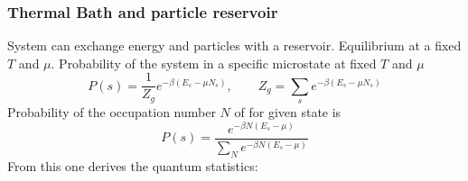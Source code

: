 \documentclass[a4paper, norsk, 8pt]{article}
\begin{document}
\begin{multicols*}{3}
\subsubsection*{\scriptsize Thermal Bath and particle reservoir}
System can exchange energy and particles with a reservoir. Equilibrium at a fixed $T$ and $\mu$. Probability of the system in a specific microstate at fixed $T$ and $\mu$
\begin{equation*}
  P(s) = \frac{1}{Z_g}e^{-\beta \left( E_s-\mu N_s \right)}, \qquad Z_g = \sum_s e^{-\beta \left(E_s-\mu N_s \right) }
\end{equation*}
Probability of the occupation number $N$ of for given state is
\begin{equation*}
  P(s) = \frac{e^{-\beta N \left( E_s-\mu  \right)}}{\sum_{N} e^{-\beta N \left( E_s-\mu  \right)}}
\end{equation*}
From this one derives the quantum statistics:

\end{multicols*}
\end{document}
